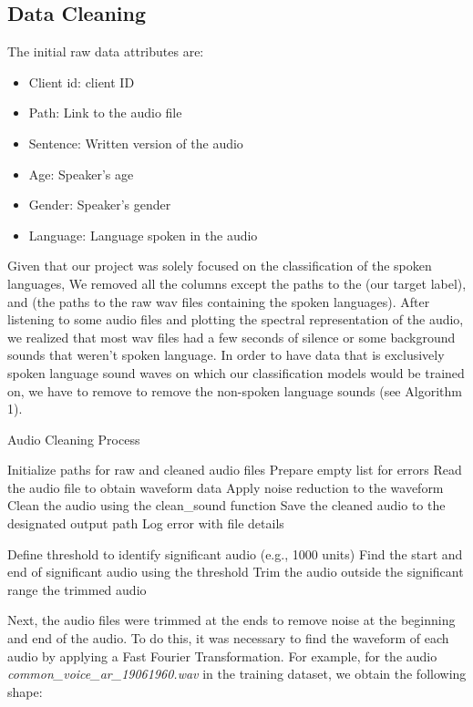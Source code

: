 \documentclass[11pt]{article}
\begin{document}
\subsection{Data Cleaning}
The initial raw data attributes are:\\
\begin{itemize}
    \item Client id: client ID
    \item Path: Link to the audio file
    \item Sentence: Written version of the audio
    \item Age: Speaker's age
    \item Gender: Speaker's gender
    \item Language: Language spoken in the audio
\end{itemize}
Given that our project was solely focused on the classification of the spoken languages, We removed all the columns except the paths to the  (our target label), and  (the paths to the raw wav files containing the spoken languages). After listening to some audio files and plotting the spectral representation of the audio, we realized that most wav files had a few seconds of silence or some background sounds that weren't spoken language. In order to have data that is exclusively spoken language sound waves on which our classification models would be trained on, we have to remove to remove the non-spoken language sounds (see Algorithm 1).  

\begin{algorithm}
\caption{Audio Cleaning Process}
\begin{algorithmic}[1]
\State Initialize paths for raw and cleaned audio files
\State Prepare empty list for errors
        \State Read the audio file to obtain waveform data
        \State Apply noise reduction to the waveform
        \Try
            \State Clean the audio using the clean\_sound function
            \State Save the cleaned audio to the designated output path
        \Except
            \State Log error with file details
        \EndTry
    \EndFor

    \State Define threshold to identify significant audio (e.g., 1000 units)
    \State Find the start and end of significant audio using the threshold
    \State Trim the audio outside the significant range
    \State \Return the trimmed audio
\EndFunction
\end{algorithmic}
\end{algorithm}
Next, the audio files were trimmed at the ends to remove noise at the beginning and end of the audio. To do this, it was necessary to find the waveform of each audio by applying a Fast Fourier Transformation. For example, for the audio \textit{common\_voice\_ar\_19061960.wav} in the training dataset, we obtain the following shape:\\
\end{document}
